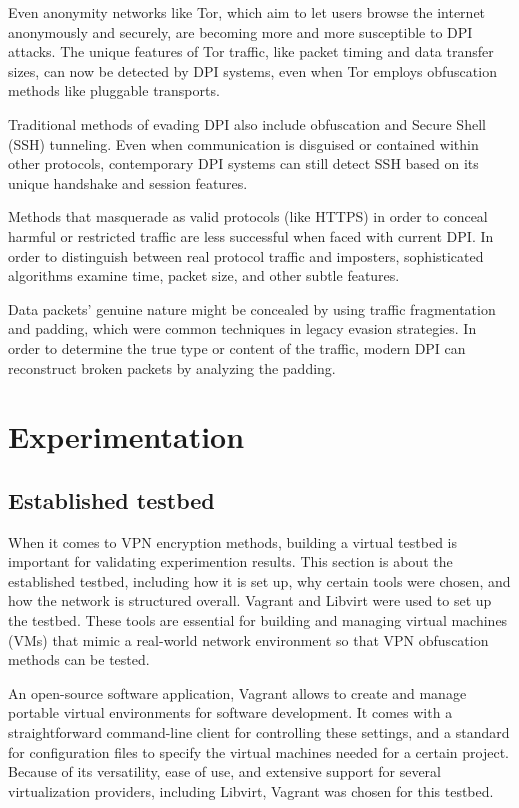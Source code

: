 \documentclass[12pt, fleqn, a4paper]{article}
\begin{document}
Even anonymity networks like Tor, which aim to let users browse the internet anonymously and securely, are becoming more and more susceptible to DPI attacks. The unique features of Tor traffic, like packet timing and data transfer sizes, can now be detected by DPI systems, even when Tor employs obfuscation methods like pluggable transports.

Traditional methods of evading DPI also include obfuscation and Secure Shell (SSH) tunneling. Even when communication is disguised or contained within other protocols, contemporary DPI systems can still detect SSH based on its unique handshake and session features. \citep{sshtunneling}

Methods that masquerade as valid protocols (like HTTPS) in order to conceal harmful or restricted traffic are less successful when faced with current DPI. In order to distinguish between real protocol traffic and imposters, sophisticated algorithms examine time, packet size, and other subtle features. \citep{dpisslinspect}

Data packets' genuine nature might be concealed by using traffic fragmentation and padding, which were common techniques in legacy evasion strategies. In order to determine the true type or content of the traffic, modern DPI can reconstruct broken packets by analyzing the padding.
\section{Experimentation}

\subsection{Established testbed}
When it comes to VPN encryption methods, building a virtual testbed is important for validating experimention results. This section is about the established testbed, including how it is set up, why certain tools were chosen, and how the network is structured overall. Vagrant and Libvirt were used to set up the testbed. These tools are essential for building and managing virtual machines (VMs) that mimic a real-world network environment so that VPN obfuscation methods can be tested.

An open-source software application, Vagrant allows to create and manage portable virtual environments for software development. It comes with a straightforward command-line client for controlling these settings, and a standard for configuration files to specify the virtual machines needed for a certain project. Because of its versatility, ease of use, and extensive support for several virtualization providers, including Libvirt, Vagrant was chosen for this testbed.
\end{document}
